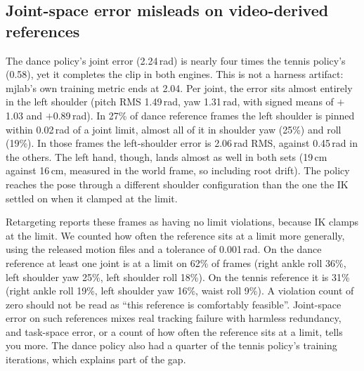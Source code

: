 \documentclass[11pt]{article}
\begin{document}
\subsection{Joint-space error misleads on video-derived references}\label{sec:limits}
The dance policy's joint error (2.24\,rad) is nearly four times the tennis policy's (0.58), yet it completes the clip in both engines. This is not a harness artifact: mjlab's own training metric ends at 2.04. Per joint, the error sits almost entirely in the left shoulder (pitch RMS 1.49\,rad, yaw 1.31\,rad, with signed means of $+$1.03 and $+$0.89\,rad). In 27\% of dance reference frames the left shoulder is pinned within 0.02\,rad of a joint limit, almost all of it in shoulder yaw (25\%) and roll (19\%). In those frames the left-shoulder error is 2.06\,rad RMS, against 0.45\,rad in the others. The left hand, though, lands almost as well in both sets (19\,cm against 16\,cm, measured in the world frame, so including root drift). The policy reaches the pose through a different shoulder configuration than the one the IK settled on when it clamped at the limit.

Retargeting reports these frames as having no limit violations, because IK clamps at the limit. We counted how often the reference sits at a limit more generally, using the released motion files and a tolerance of 0.001\,rad. On the dance reference at least one joint is at a limit on 62\% of frames (right ankle roll 36\%, left shoulder yaw 25\%, left shoulder roll 18\%). On the tennis reference it is 31\% (right ankle roll 19\%, left shoulder yaw 16\%, waist roll 9\%). A violation count of zero should not be read as ``this reference is comfortably feasible''. Joint-space error on such references mixes real tracking failure with harmless redundancy, and task-space error, or a count of how often the reference sits at a limit, tells you more. The dance policy also had a quarter of the tennis policy's training iterations, which explains part of the gap.
\end{document}
